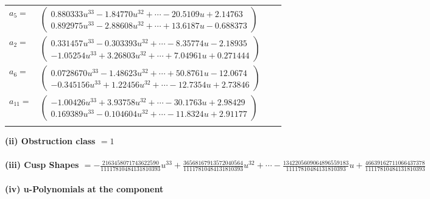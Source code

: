 \documentclass[1p]{elsarticle_modified}
\theoremstyle{definition}
\begin{document}
\begin{tabular}{m{7pt} m{180pt} m{7pt} m{180pt} }
\flushright $a_{5}=$&$\begin{pmatrix}0.880333 u^{33}-1.84770 u^{32}+\cdots-20.5109 u+2.14763\\0.892975 u^{33}-2.88608 u^{32}+\cdots+13.6187 u-0.688373\end{pmatrix}$ \\
\flushright $a_{2}=$&$\begin{pmatrix}0.331457 u^{33}-0.303393 u^{32}+\cdots-8.35774 u-2.18935\\-1.05254 u^{33}+3.26803 u^{32}+\cdots+7.04961 u+0.271444\end{pmatrix}$ \\
\flushright $a_{6}=$&$\begin{pmatrix}0.0728670 u^{33}-1.48623 u^{32}+\cdots+50.8761 u-12.0674\\-0.345156 u^{33}+1.22456 u^{32}+\cdots-12.7354 u+2.73846\end{pmatrix}$ \\
\flushright $a_{11}=$&$\begin{pmatrix}-1.00426 u^{33}+3.93758 u^{32}+\cdots-30.1763 u+2.98429\\0.169389 u^{33}-0.104604 u^{32}+\cdots-11.8324 u+2.91177\end{pmatrix}$\\&\end{tabular}
\flushleft \textbf{(ii) Obstruction class $= 1$}\\~\\
\flushleft \textbf{(iii) Cusp Shapes $= -\frac{2163458071743622590}{11117810484131810393} u^{33}+\frac{36568167913572040564}{11117810484131810393} u^{32}+\cdots-\frac{1342205609064896559183}{11117810484131810393} u+\frac{46639162711066437378}{11117810484131810393}$}\\~\\
\newpage\renewcommand{\arraystretch}{1}
\flushleft \textbf{(iv) u-Polynomials at the component}\newline \\
\end{document}
